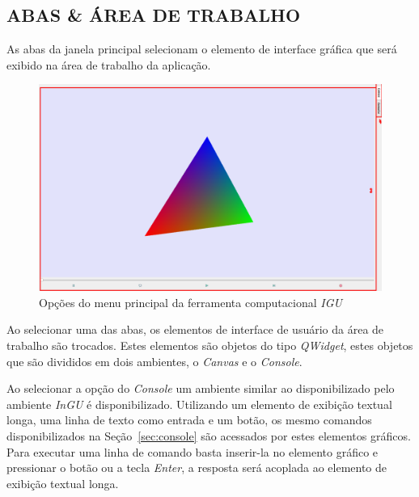 \documentclass[a4paper,12pt]{monografia}
\theoremstyle{plain}
\theoremstyle{definition}
\theoremstyle{remark}
\begin{document}
\subsection{ABAS \& ÁREA DE TRABALHO}\label{sec:abas}

As abas da janela principal selecionam o elemento de interface gráfica que será exibido na área de trabalho da aplicação.

\begin{figure}[!htbp]
	\centering
	\includegraphics[width=\linewidth]{Figures/IGU_001a_34.png}
	\caption{Opções do menu principal da ferramenta computacional \textit{IGU}}
	\label{fig:abas}
\end{figure}

Ao selecionar uma das abas, os elementos de interface de usuário da área de trabalho são trocados. Estes elementos são objetos do tipo \textit{QWidget}, estes objetos que são divididos em dois ambientes, o \textit{Canvas} e o \textit{Console}. 

Ao selecionar a opção do \textit{Console} um ambiente similar ao disponibilizado pelo ambiente \textit{InGU} é disponibilizado. Utilizando um elemento de exibição textual longa, uma linha de texto como entrada e um botão, os mesmo comandos disponibilizados na Seção~\ref{sec:console} são acessados por estes elementos gráficos. Para executar uma linha de comando basta inserir-la no elemento gráfico e pressionar o botão ou a tecla \textit{Enter}, a resposta será acoplada ao elemento de exibição textual longa.
\end{document}
